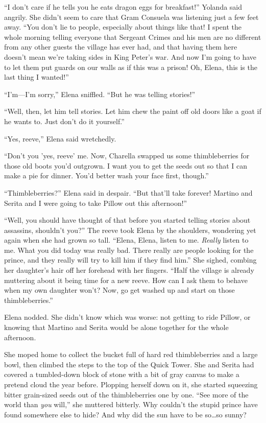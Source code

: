 \documentclass[10pt]{book}
\begin{document}
``I don't care if he tells you he eats dragon eggs for breakfast!'' Yolanda said angrily. She didn't seem to care that Gram Consuela was listening just a few feet away. ``You don't lie to people, especially about things like that! I spent the whole morning telling everyone that Sergeant Crimes and his men are no different from any other guests the village has ever had, and that having them here doesn't mean we're taking sides in King Peter's war. And now I'm going to have to let them put guards on our walls as if this was a prison! Oh, Elena, this is the last thing I wanted!''

``I'm---I'm sorry,'' Elena sniffled. ``But he was telling stories!''

``Well, then, let him tell stories. Let him chew the paint off old doors like a goat if he wants to. Just don't do it yourself.''

``Yes, reeve,'' Elena said wretchedly.

``Don't you 'yes, reeve' me. Now, Charella swapped us some thimbleberries for those old boots you'd outgrown. I want you to get the seeds out so that I can make a pie for dinner. You'd better wash your face first, though.''

``Thimbleberries?'' Elena said in despair. ``But that'll take forever! Martino and Serita and I were going to take Pillow out this afternoon!''

``Well, you should have thought of that before you started telling stories about assassins, shouldn't you?'' The reeve took Elena by the shoulders, wondering yet again when she had grown so tall. ``Elena, Elena, listen to me. \emph{Really} listen to me. What you did today was really bad. There really are people looking for the prince, and they really will try to kill him if they find him.'' She sighed, combing her daughter's hair off her forehead with her fingers. ``Half the village is already muttering about it being time for a new reeve. How can I ask them to behave when my own daughter won't? Now, go get washed up and start on those thimbleberries.''

Elena nodded. She didn't know which was worse: not getting to ride Pillow, or knowing that Martino and Serita would be alone together for the whole afternoon.

She moped home to collect the bucket full of hard red thimbleberries and a large bowl, then climbed the steps to the top of the Quick Tower. She and Serita had covered a tumbled-down block of stone with a bit of gray canvas to make a pretend cloud the year before. Plopping herself down on it, she started squeezing bitter grain-sized seeds out of the thimbleberries one by one. ``See more of the world than \emph{you} will,'' she muttered bitterly. Why couldn't the stupid prince have found somewhere else to hide? And why did the sun have to be so{\ldots}so sunny?
\end{document}
